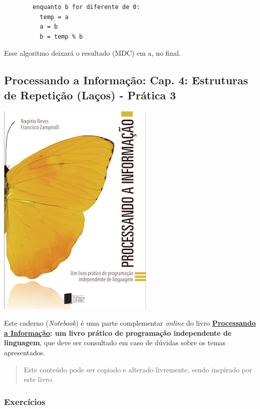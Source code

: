 \documentclass[12pt,a4paper]{article}
\begin{document}
\begin{verbatim}
        enquanto b for diferente de 0:
          temp = a
          a = b
          b = temp % b
\end{verbatim}

Esse algoritmo deixará o resultado (MDC) em a, no final.

    \hypertarget{processando-a-informauxe7uxe3o-cap.-4-estruturas-de-repetiuxe7uxe3o-lauxe7os---pruxe1tica-3}{%
\subsection{Processando a Informação: Cap. 4: Estruturas de Repetição
(Laços) - Prática
3}\label{processando-a-informauxe7uxe3o-cap.-4-estruturas-de-repetiuxe7uxe3o-lauxe7os---pruxe1tica-3}}

    \includegraphics{"figs/Capa_Processando_Informacao.jpg"}

Este caderno (\emph{Notebook}) é uma parte complementar \emph{online} do
livro
\textbf{\href{https://editora.ufabc.edu.br/matematica-e-ciencias-da-computacao/58-processando-a-informacao}{Processando
a Informação}: um livro prático de programação independente de
linguagem}, que deve ser consultado em caso de dúvidas sobre os temas
apresentados.

\begin{quote}
Este conteúdo pode ser copiado e alterado livremente, sendo inspirado
por este livro.
\end{quote}

    \hypertarget{exercuxedcios}{%
\subsubsection{Exercícios}\label{exercuxedcios}}
\end{document}

